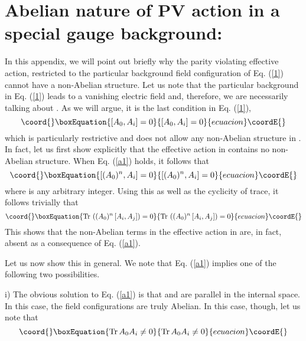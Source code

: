 \documentclass[a4paper,12pt]{article}
\begin{document}
\section{Abelian nature of PV action in a special gauge background:}
In this appendix, we will point out briefly why the parity violating
effective action, restricted to the particular background field
configuration of Eq. (\ref{1}) cannot have a non-Abelian
structure. Let us note that the particular background in Eq. (\ref{1})
leads to a vanishing electric field and, therefore, we are necessarily
talking about \coordHE{}. As we will
argue, it is the last condition in Eq. (\ref{1}),
\begin{equation}\coord{}\boxEquation{
\left[A_{0}, A_{i}\right] = 0\label{a1}
}{
\left[A_{0}, A_{i}\right] = 0}{ecuacion}\coordE{}\end{equation}
which is particularly restrictive and does not allow any non-Abelian
structure in \coordHE{}. In fact, let
us first show explicitly that the effective action in \cite{fosco:1997vu}
contains no non-Abelian structure. When Eq. (\ref{a1}) holds, it follows that
\begin{equation}\coord{}\boxEquation{
\left[(A_{0})^{n}, A_{i}\right] = 0\label{a'}
}{
\left[(A_{0})^{n}, A_{i}\right] = 0}{ecuacion}\coordE{}\end{equation}
where \coordHE{} is any arbitrary integer. Using this as well as the
cyclicity of trace, it follows trivially that
\begin{equation}\coord{}\boxEquation{
{\rm Tr}\,\left((A_{0})^{n}\left[A_{i},A_{j}\right]\right) = 0
}{
{\rm Tr}\,\left((A_{0})^{n}\left[A_{i},A_{j}\right]\right) = 0
}{ecuacion}\coordE{}\end{equation}
This shows that the non-Abelian terms in the effective action in
\cite{fosco:1997vu} are, in fact, absent as a consequence of Eq. (\ref{a1}).

Let us now show this in general. We note that Eq. (\ref{a1}) implies
one of the following two possibilities.

i) The obvious solution to Eq. (\ref{a1}) is that \coordHE{} and \coordHE{}
are parallel in the internal space. In this case, the field
configurations are truly Abelian. In this case, though, let us note
that
\begin{equation}\coord{}\boxEquation{
{\rm Tr}\, A_{0}A_{i} \neq 0\label{a2}
}{
{\rm Tr}\, A_{0}A_{i} \neq 0}{ecuacion}\coordE{}\end{equation}
\end{document}
